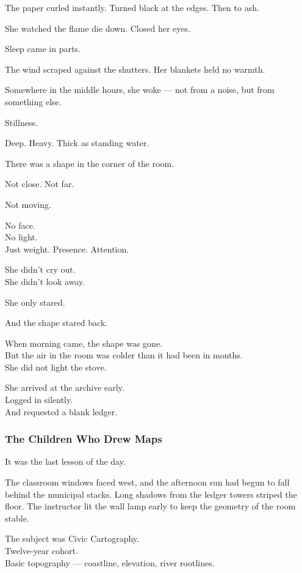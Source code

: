 \documentclass[12pt]{article}
\begin{document}
The paper curled instantly. Turned black at the edges. Then to ash.

She watched the flame die down. Closed her eyes.

\vspace{1em}

Sleep came in parts.

The wind scraped against the shutters. Her blankets held no warmth.

Somewhere in the middle hours, she woke --- not from a noise, but from something else.

Stillness.

Deep. Heavy. Thick as standing water.

There was a shape in the corner of the room.

Not close. Not far.

Not moving.

No face.\\
No light.\\
Just weight. Presence. Attention.

She didn’t cry out.\\
She didn’t look away.

She only stared.

And the shape stared back.

\vspace{1em}

When morning came, the shape was gone.\\
But the air in the room was colder than it had been in months.\\
She did not light the stove.

She arrived at the archive early.\\
Logged in silently.\\
And requested a blank ledger.

\dotfill

\subsubsection*{The Children Who Drew Maps}

It was the last lesson of the day.

The classroom windows faced west, and the afternoon sun had begun to fall behind the municipal stacks. Long shadows from the ledger towers striped the floor. The instructor lit the wall lamp early to keep the geometry of the room stable.

The subject was Civic Cartography.\\
Twelve-year cohort.\\
Basic topography --- coastline, elevation, river rootlines.
\end{document}
